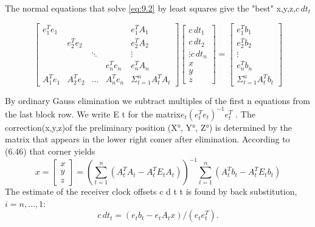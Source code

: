	The normal equations that solve \ref{eq:9.2} by least squares give the "best" x,y,z,$c\,dt_t$
	
	\begin{equation}\label{eq:9.3}
		\begin{bmatrix}
		e^T_1e_1 & & & & e^T_1A_1 \\
		& e^T_2e_2 & & & e^T_2A_2 \\
		& & \ddots   & & \vdots	  \\
		& & & e^T_ne_n & e^T_nA_n \\
		A^T_1e_1 & A^T_2e_2 & \ldots & A^T_ne_n & \Sigma ^n_{t=1}A^T_tA_t
		\end{bmatrix}
		\begin{bmatrix}
		c\,dt_1 \\
		c\,dt_2 \\
		\vdots
		c\,dt_n \\
		x \\
		y \\
		z 
		\end{bmatrix}
		=
		\begin{bmatrix}
		e^T_1b_1 \\
		e^T_2b_2 \\
		\vdots	 \\
		e^T_nb_n \\
		\Sigma ^n_{t=1}A^T_tb_t
		\end{bmatrix}
	\end{equation}
	
	By ordinary Gauss elimination we subtract multiples of the first n equations from the last block row. We write E t for the matrix$e_t(e^T_te_t)^{-1}e^T_t$ . The correction(x,y,z)of the preliminary position (X°, Y°, Z°) is determined by the matrix that appears in the lower right comer after elimination. According to (6.46) that corner yields
	$$x=\begin{bmatrix}
	x \\ y \\ z
	\end{bmatrix}=\left( \sum^n_{t=1}(A^T_tA_t-A^T_tE_tA_t)\right)^{-1}\sum^n_{t=1}(A^T_tb_t-A^T_tE_tb_t) $$
	The estimate of the receiver clock offsets c d t t is found by back substitution,$i=n,\ldots,1$:
	\begin{equation}
		c\,dt_t=(e_tb_t-e_tA_tx)/(e_te_t^T).
	\end{equation}
	
